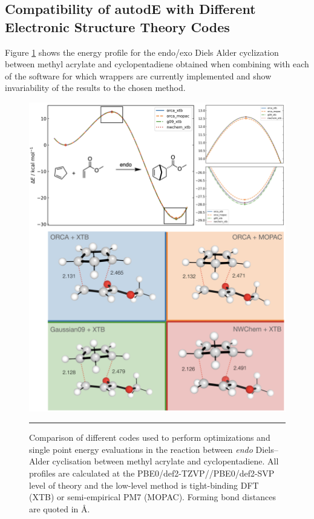 \documentclass[../../main.tex]{subfiles}
\begin{document}
\subsection{Compatibility of autodE with Different Electronic Structure Theory Codes}

Figure \ref{fig::ade_si_1a} shows the energy profile for the endo/exo Diels Alder cyclization between methyl acrylate and cyclopentadiene obtained when combining \ade with each of the software for which wrappers are currently implemented and show invariability of the results to the chosen method. 


\begin{figure}[h!]
	\vspace{0.4cm}
	\centering
	\includegraphics[width=14cm]{5/autode/figs/figS1a}
	\vspace{0.4cm}
	\hrule
	\caption{Comparison of different codes used to perform optimizations and single point energy evaluations in the reaction between \emph{endo} Diels--Alder cyclisation between methyl acrylate and cyclopentadiene. All profiles are calculated at the PBE0/def2-TZVP//PBE0/def2-SVP level of theory and the low-level method is tight-binding DFT (XTB) or semi-empirical PM7 (MOPAC). Forming bond distances are quoted in \AA.}
	\label{fig::ade_si_1a}
\end{figure}
\end{document}
